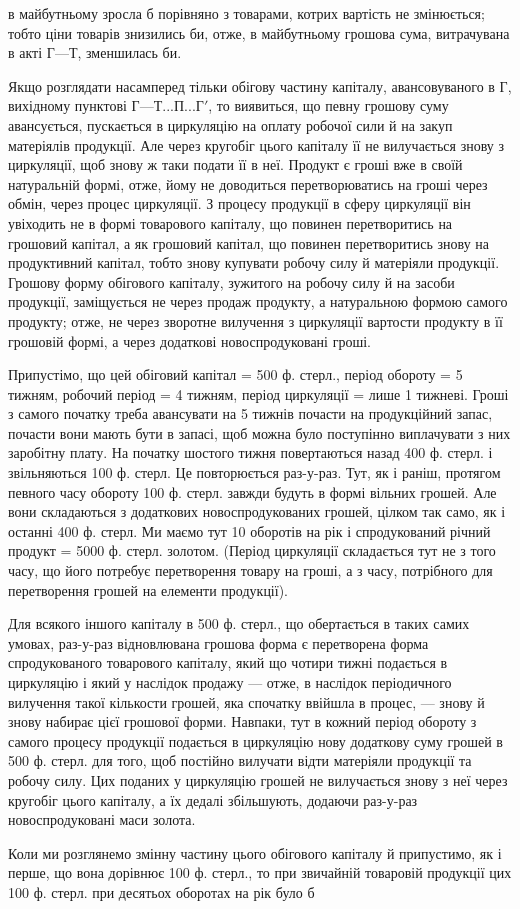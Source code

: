 \parcont{}  %
в майбутньому зросла б порівняно з товарами, котрих вартість не змінюється;
тобто ціни товарів знизились би, отже, в майбутньому грошова
сума, витрачувана в акті $Г — Т$, зменшилась би.

Якщо розглядати насамперед тільки обігову частину капіталу, авансовуваного
в Г, вихідному пунктові $Г — Т... П... Г'$, то виявиться, що певну
грошову суму авансується, пускається в циркуляцію на оплату робочої
сили й на закуп матеріялів продукції. Але через кругобіг цього капіталу
її не вилучається знову з циркуляції, щоб знову ж таки подати її
в неї. Продукт є гроші вже в своїй натуральній формі, отже, йому не
доводиться перетворюватись на гроші через обмін, через процес
циркуляції. З процесу продукції в сферу циркуляції він увіходить не в
формі товарового капіталу, що повинен перетворитись на грошовий капітал,
а як грошовий капітал, що повинен перетворитись знову на продуктивний
капітал, тобто знову купувати робочу силу й матеріяли продукції.
Грошову форму обігового капіталу, зужитого на робочу силу й на засоби
продукції, заміщується не через продаж продукту, а натуральною
формою самого продукту; отже, не через зворотне вилучення з циркуляції
вартости продукту в її грошовій формі, а через додаткові новоспродуковані
гроші.

Припустімо, що цей обіговий капітал = 500 ф. стерл., період обороту
= 5 тижням, робочий період = 4 тижням, період циркуляції = лише 1
тижневі. Гроші з самого початку треба авансувати на 5 тижнів почасти
на продукційний запас, почасти вони мають бути в запасі, щоб можна
було поступінно виплачувати з них заробітну плату. На початку шостого
тижня повертаються назад 400 ф. стерл. і звільняються 100 ф. стерл. Це
повторюється раз-у-раз. Тут, як і раніш, протягом певного часу обороту
100 ф. стерл. завжди будуть в формі вільних грошей. Але вони складаються
з додаткових новоспродукованих грошей, цілком так само, як і останні
400 ф. стерл. Ми маємо тут 10 оборотів на рік і спродукований річний
продукт = 5000 ф. стерл. золотом. (Період циркуляції складається тут
не з того часу, що його потребує перетворення товару на гроші, а з
часу, потрібного для перетворення грошей на елементи продукції).

Для всякого іншого капіталу в 500 ф. стерл., що обертається в таких
самих умовах, раз-у-раз відновлювана грошова форма є перетворена форма
спродукованого товарового капіталу, який що чотири тижні подається
в циркуляцію і який у наслідок продажу — отже, в наслідок періодичного
вилучення такої кількости грошей, яка спочатку ввійшла в процес, —
знову й знову набирає цієї грошової форми. Навпаки, тут в кожний період
обороту з самого процесу продукції подається в циркуляцію нову
додаткову суму грошей в 500 ф. стерл. для того, щоб постійно вилучати
відти матеріяли продукції та робочу силу. Цих поданих у циркуляцію
грошей не вилучається знову з неї через кругобіг цього капіталу, а їх
дедалі збільшують, додаючи раз-у-раз новоспродуковані маси золота.

Коли ми розглянемо змінну частину цього обігового капіталу й припустимо,
як і перше, що вона дорівнює 100 ф. стерл., то при звичайній
товаровій продукції цих 100 ф. стерл. при десятьох оборотах на рік було б
\parbreak{}  %
